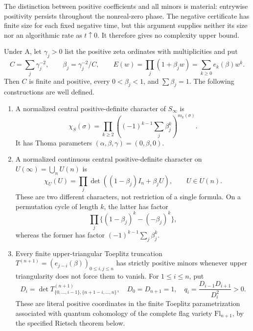 The distinction between positive coefficients and all minors is material:
entrywise positivity persists throughout the nonreal-zero phase. The
negative certificate has finite size for each fixed negative time, but
this argument supplies neither its size nor an algorithmic rate as
$t\uparrow0$. It therefore gives no complexity upper bound.

\begin{theorem}
Under A, let $\gamma_j>0$ list the positive zeta ordinates with
multiplicities and put
\[
 C=\sum_j\gamma_j^{-2},\qquad
 \beta_j=\gamma_j^{-2}/C,\qquad
 E(w)=\prod_j(1+\beta_jw)=\sum_{k\ge0}e_k(\beta)w^k.
\]
Then $C$ is finite and positive, every $0<\beta_j<1$, and
$\sum\beta_j=1$. The following constructions are well defined.
\begin{enumerate}
\item A normalized central positive-definite character of $S_\infty$ is
\[
 \chi_S(\sigma)=\prod_{k\ge2}
 \left((-1)^{k-1}\sum_j\beta_j^k\right)^{m_k(\sigma)}.
\]
It has Thoma parameters $(\alpha,\beta,\gamma)=(0,\beta,0)$.
\item A normalized continuous central positive-definite character on
$U(\infty)=\bigcup_nU(n)$ is
\[
 \chi_U(U)=\prod_j\det((1-\beta_j)I_n+\beta_jU),\qquad U\in U(n).
\]
These are two different characters, not restriction of a single formula.
On a permutation cycle of length $k$, the latter has factor
\[
 \prod_j\{(1-\beta_j)^k-(-\beta_j)^k\},
\]
whereas the former has factor $(-1)^{k-1}\sum_j\beta_j^k$.
\item Every finite upper-triangular Toeplitz truncation
$T^{(n+1)}=(e_{j-i}(\beta))_{0\le i,j\le n}$ has strictly positive
minors whenever upper triangularity does not force them to vanish.
For $1\le i\le n$, put
\[
 D_i=\det T^{(n+1)}_{\{0,\ldots,i-1\},\{n+1-i,\ldots,n\}},
 \quad D_0=D_{n+1}=1,\quad
 q_i=\frac{D_{i-1}D_{i+1}}{D_i^2}>0.
\]
These are literal positive coordinates in the finite Toeplitz
parametrization associated with quantum cohomology of the complete flag
variety $\mathrm{Fl}_{n+1}$, by the specified Rietsch theorem below.
\end{enumerate}
\end{theorem}
